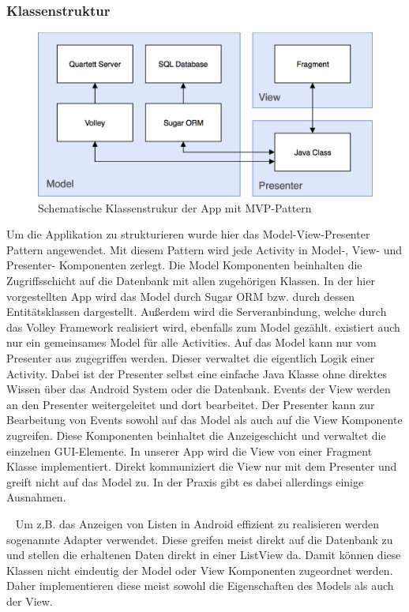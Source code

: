 \documentclass{scrartcl}
\begin{document}
\subsubsection{Klassenstruktur}

\begin{figure}[!ht]
  \centering
  \includegraphics[width=\textwidth]{img/class_structure.png}
  \caption{Schematische Klassenstrukur der App mit MVP-Pattern}
\end{figure}

Um die Applikation zu strukturieren wurde hier das Model-View-Presenter Pattern
angewendet. Mit diesem Pattern wird jede Activity in Model-, View- und
Presenter- Komponenten zerlegt. Die Model Komponenten beinhalten die
Zugriffsschicht auf die Datenbank mit allen zugehörigen Klassen. In der hier
vorgestellten App wird das Model durch Sugar ORM bzw. durch dessen
Entitätsklassen dargestellt. Außerdem wird die Serveranbindung, welche durch das
Volley Framework realisiert wird, ebenfalls zum Model gezählt. existiert auch
nur ein gemeinsames Model für alle Activities. Auf das Model kann nur vom
Presenter aus zugegriffen werden. Dieser verwaltet die
eigentlich Logik einer Activity. Dabei ist der Presenter selbst eine einfache
Java Klasse ohne direktes Wissen über das Android System oder die Datenbank.
Events der View werden an den Presenter weitergeleitet und dort bearbeitet. Der
Presenter kann zur Bearbeitung von Events sowohl auf das Model als auch auf die
View Komponente zugreifen. Diese Komponenten beinhaltet die Anzeigeschicht und
verwaltet die einzelnen GUI-Elemente. In unserer App wird die View von einer
Fragment Klasse implementiert. Direkt kommuniziert die View nur mit dem
Presenter und greift nicht auf das Model zu. In der Praxis gibt es dabei
allerdings einige Ausnahmen.

\ \newline
Um z.B. das Anzeigen von Listen in Android
effizient zu realisieren werden sogenannte Adapter verwendet. Diese greifen
meist direkt auf die Datenbank zu und stellen die erhaltenen Daten direkt in
einer ListView da. Damit können diese Klassen nicht eindeutig der Model oder
View Komponenten zugeordnet werden. Daher implementieren diese meist sowohl die
Eigenschaften des Models als auch der View.
\end{document}
